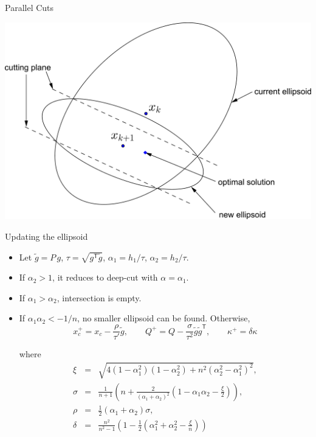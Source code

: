 \documentclass[10pt,ignorenonframetext,serif,onlymath]{beamer}
\begin{document}
\begin{frame}{Parallel Cuts}
\protect\hypertarget{sec:parallel-cuts-1}{}

\includegraphics{ellipsoid.files/parallel_cut.pdf}

\end{frame}

\begin{frame}{Updating the ellipsoid}
\protect\hypertarget{sec:updating-the-ellipsoid}{}

\begin{itemize}
\item
  Let \(\tilde{g} = P\,g\), \(\tau = \sqrt{g^\mathsf{T}\tilde{g}}\),
  \(\alpha_1 = h_1/\tau\), \(\alpha_2 = h_2/\tau\).
\item
  If \(\alpha_2 > 1\), it reduces to deep-cut with
  \(\alpha = \alpha_1\).
\item
  If \(\alpha_1 > \alpha_2\), intersection is empty.
\item
  If \(\alpha_1 \alpha_2 < -1/n\), no smaller ellipsoid can be found.
  Otherwise, \[x_c^+ = x_c - \frac{\rho}{\tau'} \tilde{g}, \qquad
  Q^+ = Q - \frac{\sigma}{\tau^2} \tilde{g}\tilde{g}^\mathsf{T}, \qquad
  \kappa^+ =  \delta \kappa
   \]

  where \[\begin{array}{lll}
    \xi &=& \sqrt{4(1 - \alpha_1^2)(1 - \alpha_2^2) + n^2(\alpha_2^2 - \alpha_1^2)^2}, \\
    \sigma &=& \frac{1}{n+1}(n + \frac{2}{(\alpha_1 + \alpha_2)^2}(1 - \alpha_1\alpha_2 - \frac{\xi}{2})), \\
    \rho &=& \frac{1}{2}(\alpha_1 + \alpha_2) \sigma, \\
    \delta &=& \frac{n^2}{n^2-1} (1 - \frac{1}{2}(\alpha_1^2 + \alpha_2^2 - \frac{\xi}{n}))
   \end{array}\]
\end{itemize}

\end{frame}
\end{document}
